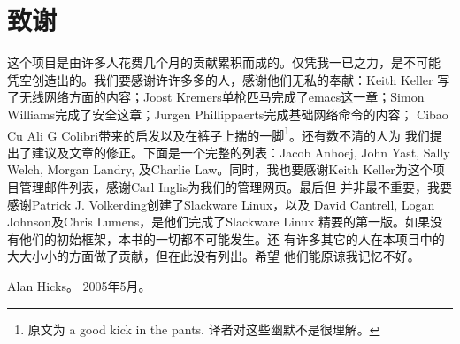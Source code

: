 \section*{致谢}
\label{sec:preface:acknowledgments}

这个项目是由许多人花费几个月的贡献累积而成的。仅凭我一已之力，是不可能
凭空创造出的。我们要感谢许许多多的人，感谢他们无私的奉献：Keith Keller
写了无线网络方面的内容；Joost Kremers单枪匹马完成了emacs这一章；Simon
Williams完成了安全这章；Jurgen Phillippaerts完成基础网络命令的内容；
Cibao Cu Ali G Colibri带来的启发以及在裤子上揣的一脚\footnote{原文为 a
good kick in the pants. 译者对这些幽默不是很理解。}。还有数不清的人为
我们提出了建议及文章的修正。下面是一个完整的列表：Jacob Anhoej, John
Yast, Sally Welch, Morgan Landry, 及Charlie Law。同时，我也要感谢Keith
Keller为这个项目管理邮件列表，感谢Carl Inglis为我们的管理网页。最后但
并非最不重要，我要感谢Patrick J. Volkerding创建了Slackware Linux，以及
David Cantrell, Logan Johnson及Chris Lumens，是他们完成了Slackware
Linux 精要的第一版。如果没有他们的初始框架，本书的一切都不可能发生。还
有许多其它的人在本项目中的大大小小的方面做了贡献，但在此没有列出。希望
他们能原谅我记忆不好。

Alan Hicks。 2005年5月。




